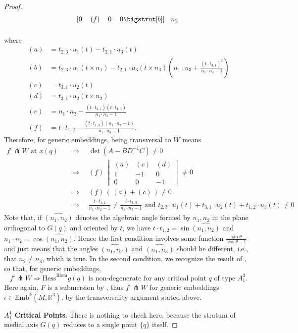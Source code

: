 \documentclass[11pt]{article}
\newcommand{\R}{\mathbb{R}}
\newcommand{\io}{\iota}
\newcommand{\Emb}{\mathrm{Emb}^k(M,\R^3)}
\newcommand{\Hess}{\mathrm{Hess}}
\newcommand\botstrut[1][1.2ex]{\setlength\bigstrutjot{#1}{\bigstrut[b]}}
\theoremstyle{plain}
\theoremstyle{definition}
\theoremstyle{remark}
\begin{document}
\begin{proof}
\[\begin{blockarray}{ccccl}
\begin{block}{[cccc] l}
				0 & (f) & 0 & 0 \botstrut & n_2 \\
			\end{block}
		\end{blockarray}
		\]
		where
		\begin{align*}
			(a) &= t_{2,3} \cdot u_1(t) - t_{2,1} \cdot u_3(t) \\
			(b) &= t_{2,3} \cdot u_1(t \times n_1) - t_{2,1} \cdot u_3(t \times n_3) \left( n_1 \cdot n_3 + \frac{(t \cdot t_{3,1})^2}{n_1 \cdot n_3 - 1} \right) \\
			(c) &= t_{3,1} \cdot u_2(t) \\
			(d) &= t_{3,1} \cdot u_2(t \times n_2) \\
			(e) &= n_1 \cdot n_2 - \frac{(t \cdot t_{2,1})(t \cdot t_{1,3})}{n_1 \cdot n_3 - 1} \\
			(f) &= t \cdot t_{1,2} - \frac{(t \cdot t_{1,3})(n_1 \cdot n_2 - 1)}{n_1 \cdot n_3 - 1}.
		\end{align*}
		Therefore, for generic embeddings, being transversal to $W$ means 
		\begin{align*}
			f^\io \pitchfork W \text{ at } x(q) \quad & \Rightarrow \quad \det(A - B D^{-1} C) \neq 0 \\
			&\Rightarrow \quad (f) ~
			\begin{vmatrix}
				(a) & (c) & (d) \\
				1 & -1 & 0 \\
				0 & 0 & -1
			\end{vmatrix} \neq 0 \\
			&\Rightarrow \quad (f) \, \left( \, (a) + (c) \, \right) \neq 0 \\
			&\Rightarrow \quad \frac{t \cdot t_{1,2}}{n_1 \cdot n_2 - 1} \neq \frac{t \cdot t_{1,3}}{n_1 \cdot n_3 - 1} \text{ and } 
			t_{2,3} \cdot u_1(t) + t_{3,1} \cdot u_2(t) + t_{1,2} \cdot u_3(t) \neq 0
		\end{align*}
		Note that, if $\widehat{(n_1, n_2)}$ denotes the algebraic angle formed by $n_1,n_2$ in the plane orthogonal to $G(q)$ and oriented by $t$, we have $t \cdot t_{1,2} = \sin \widehat{(n_1, n_2)}$ and $n_1 \cdot n_2 = \cos \widehat{(n_1, n_2)}$. Hence the first condition involves some function $\frac{\sin \theta}{\cos \theta - 1}$ and just means that the angles $\widehat{(n_1, n_2)}$ and $\widehat{(n_1,n_3)}$ should be different, i.e., that $n_2 \neq n_3$, which is true. In the second condition, we recognize the result of , so that, for generic embeddings,
		\[f^\io \pitchfork W \Rightarrow \Hess^\mathrm{Riem} g(q) \text{ is non-degenerate for any critical point } q \text{ of type } A_1^3. \]
		Here again, $F$ is a submersion by , thus $f^\io \pitchfork W$ for generic embeddings $\io \in \Emb$, by the transversality argument stated above.
		
		\textbf{$A_1^4$ Critical Points}. There is nothing to check here, because the stratum of medial axis $G(q)$ reduces to a single point $\{q\}$ itself.
		
	\end{proof}
	
\end{document}
